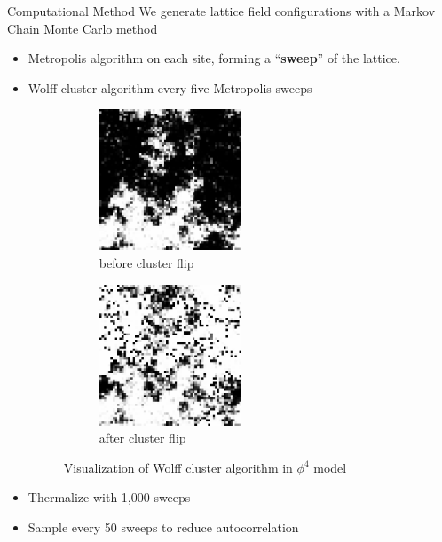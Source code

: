 \documentclass[18pt]{beamer}
\begin{document}
\begin{frame}{}
\begin{columns}[t]
\begin{column}{0.32\linewidth}
        \begin{block}{Computational Method}
            We generate lattice field configurations with a Markov Chain Monte Carlo method
            \begin{itemize}
                \item Metropolis algorithm on each site, forming a ``{\bf sweep}'' of the lattice.
                \item Wolff cluster algorithm every five Metropolis sweeps
                \begin{figure}[h]
                  \centering
                      \begin{subfigure}[b]{0.3\textwidth}\centering
                        \includegraphics[width=0.5\textwidth]{wolffa.png}
                        \caption{before cluster flip}
                      \end{subfigure}%
                      \begin{subfigure}[b]{0.3\textwidth}\centering
                        \includegraphics[width=0.5\textwidth]{wolffb.png}
                        \caption{after cluster flip}
                      \end{subfigure}
                      \hfill
                      \caption{\label{fig:wolff} Visualization of Wolff cluster algorithm in $\phi^4$ model}
                \end{figure}
                 \item Thermalize with 1,000 sweeps
                \item Sample every 50 sweeps to reduce autocorrelation
            \end{itemize}
            

\end{block}
\end{column}
\end{columns}
\end{frame}
\end{document}

